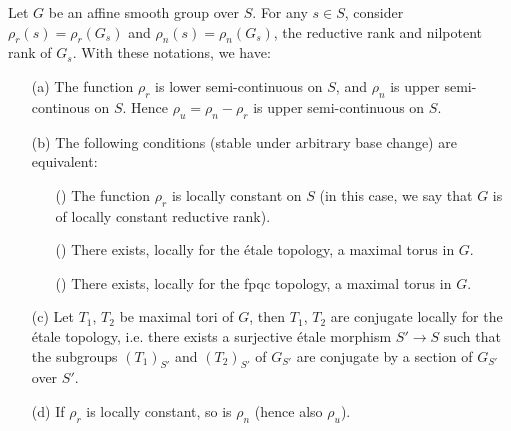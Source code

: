 \begin{theorem}\label{scheme group affine smooth rho_r and rho_n and maximal tori prop}
Let $G$ be an affine smooth group over $S$. For any $s\in S$, consider $\rho_r(s)=\rho_r(G_s)$ and $\rho_n(s)=\rho_n(G_s)$, the reductive rank and nilpotent rank of $G_s$. With these notations, we have:
\begin{enumerate}
    \item[(a)] The function $\rho_r$ is lower semi-continuous on $S$, and $\rho_n$ is upper semi-continous on $S$. Hence $\rho_u=\rho_n-\rho_r$ is upper semi-continuous on $S$.
    \item[(b)] The following conditions (stable under arbitrary base change) are equivalent:
    \begin{enumerate}
        \item[(\rmnum{1})] The function $\rho_r$ is locally constant on $S$ (in this case, we say that $G$ is of locally constant reductive rank).
        \item[(\rmnum{2})] There exists, locally for the \'etale topology, a maximal torus in $G$.
        \item[(\rmnum{3})] There exists, locally for the fpqc topology, a maximal torus in $G$.
    \end{enumerate}
    \item[(c)] Let $T_1$, $T_2$ be maximal tori of $G$, then $T_1$, $T_2$ are conjugate locally for the \'etale topology, i.e. there exists a surjective \'etale morphism $S'\to S$ such that the subgroups $(T_1)_{S'}$ and $(T_2)_{S'}$ of $G_{S'}$ are conjugate by a section of $G_{S'}$ over $S'$.
    \item[(d)] If $\rho_r$ is locally constant, so is $\rho_n$ (hence also $\rho_u$).
\end{enumerate}
\end{theorem}
